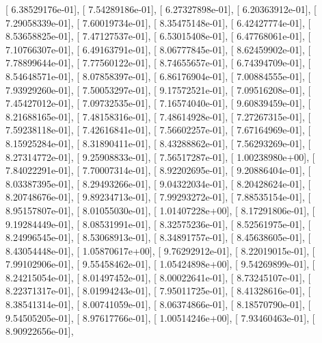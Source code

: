 \documentclass{article}
\begin{document}
       [  6.38529176e-01],
       [  7.54289186e-01],
       [  6.27327898e-01],
       [  6.20363912e-01],
       [  7.29058339e-01],
       [  7.60019734e-01],
       [  8.35475148e-01],
       [  6.42427774e-01],
       [  8.53658825e-01],
       [  7.47127537e-01],
       [  6.53015408e-01],
       [  6.47768061e-01],
       [  7.10766307e-01],
       [  6.49163791e-01],
       [  8.06777845e-01],
       [  8.62459902e-01],
       [  7.78899644e-01],
       [  7.77560122e-01],
       [  8.74655657e-01],
       [  6.74394709e-01],
       [  8.54648571e-01],
       [  8.07858397e-01],
       [  6.86176904e-01],
       [  7.00884555e-01],
       [  7.93929260e-01],
       [  7.50053297e-01],
       [  9.17572521e-01],
       [  7.09516208e-01],
       [  7.45427012e-01],
       [  7.09732535e-01],
       [  7.16574040e-01],
       [  9.60839459e-01],
       [  8.21688165e-01],
       [  7.48158316e-01],
       [  7.48614928e-01],
       [  7.27267315e-01],
       [  7.59238118e-01],
       [  7.42616841e-01],
       [  7.56602257e-01],
       [  7.67164969e-01],
       [  8.15925284e-01],
       [  8.31890411e-01],
       [  8.43288862e-01],
       [  7.56293269e-01],
       [  8.27314772e-01],
       [  9.25908833e-01],
       [  7.56517287e-01],
       [  1.00238980e+00],
       [  7.84022291e-01],
       [  7.70007314e-01],
       [  8.92202695e-01],
       [  9.20886404e-01],
       [  8.03387395e-01],
       [  8.29493266e-01],
       [  9.04322034e-01],
       [  8.20428624e-01],
       [  8.20748676e-01],
       [  9.89234713e-01],
       [  7.99293272e-01],
       [  7.88535154e-01],
       [  8.95157807e-01],
       [  8.01055030e-01],
       [  1.01407228e+00],
       [  8.17291806e-01],
       [  9.19284449e-01],
       [  8.08531991e-01],
       [  8.32575236e-01],
       [  8.52561975e-01],
       [  8.24996545e-01],
       [  8.53068913e-01],
       [  8.34891757e-01],
       [  8.45638605e-01],
       [  8.43054448e-01],
       [  1.05870617e+00],
       [  9.76292912e-01],
       [  8.22019015e-01],
       [  7.99102906e-01],
       [  9.55458462e-01],
       [  1.05424898e+00],
       [  9.54269899e-01],
       [  8.24215054e-01],
       [  8.01497452e-01],
       [  8.00022641e-01],
       [  8.73245107e-01],
       [  8.22371317e-01],
       [  8.01994243e-01],
       [  7.95011725e-01],
       [  8.41328616e-01],
       [  8.38541314e-01],
       [  8.00741059e-01],
       [  8.06374866e-01],
       [  8.18570790e-01],
       [  9.54505205e-01],
       [  8.97617766e-01],
       [  1.00514246e+00],
       [  7.93460463e-01],
       [  8.90922656e-01],
\end{document}
